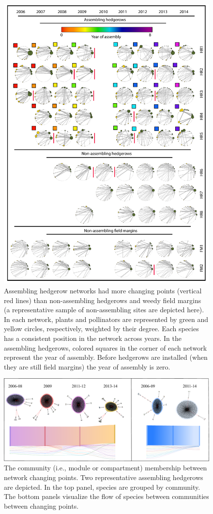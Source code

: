\documentclass[12pt]{article}
\begin{document}
\begin{figure}
  \centering
  \includegraphics[width=.8\textwidth]{../analysis/changePoint/plotting/networks.pdf}
  \caption{Assembling hedgerow networks had more changing points
    (vertical red lines) than non-assembling hedgerows and weedy field
    margins (a representative sample of non-assembling sites are
    depicted here). In each network, plants and pollinators are
    represented by green and yellow circles, respectively, weighted by
    their degree. Each species has a consistent position in the
    network across years. In the assembling hedgerows, colored squares
    in the corner of each network represent the year of
    assembly. Before hedgerows are installed (when they are still
    field margins) the year of assembly is zero.}
  \label{fig:changePoints}
\end{figure}
\clearpage

\begin{figure}
  \centering
  \includegraphics[width=.8\textwidth]{../analysis/changePoint/plotting/communitiesSkanky.pdf}
  \caption{The community (i.e., module or compartment) membership
    between network changing points. Two representative assembling
    hedgerows are depicted. In the top panel, species are grouped by
    community. The bottom panels visualize the flow of species between
    communities between changing points. }
  \label{fig:changePoints2}
\end{figure}
\clearpage
\end{document}
